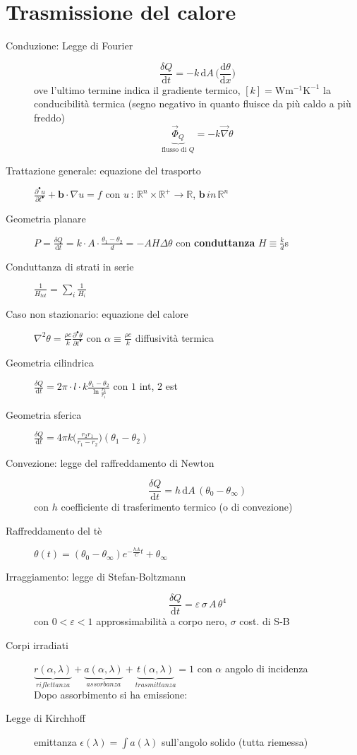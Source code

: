 \documentclass[10pt, oneside]{article}
\begin{document}
\section{Trasmissione del calore}
\begin{description}
\item[\large Conduzione: Legge di Fourier] 
\[\boxed{\frac{\delta Q}{\mathrm{d}t} = - k \, \mathrm{d}A \, \bigg(\frac{\mathrm{d}\theta}{\mathrm{d}x}\bigg)}\] ove l'ultimo termine indica il gradiente termico, $[k] = \mathrm{W m^{-1} K^{-1}}$ la conducibilità termica (segno negativo in quanto fluisce da più caldo a più freddo)
\[\underbrace{\vec{\Phi}_Q}_{\textrm{flusso di } Q} = - k \vec{\nabla} \theta\]
\item[Trattazione generale: equazione del trasporto] $\displaystyle \frac{\partial^{•} u}{\partial t^{•}} + \mathbf{b} \cdot \nabla u = f$ con $u \, : \, \mathbb{R}^n \times \mathbb{R}^+ \rightarrow \mathbb{R}$, $\mathbf{b} \, in \, \mathbb{R}^n$
\item[Geometria planare] $\displaystyle P = \frac{\delta Q}{\mathrm{d} t} = k \cdot A \cdot \frac{\theta_1 - \theta_2}{d} = - A H \Delta \theta$ con \textbf{conduttanza} $\displaystyle H \equiv \frac{k}{d}$s
\item[Conduttanza di strati in serie] $\displaystyle \frac{1}{H_{tot}} = \sum_i \frac{1}{H_i}$
\item[Caso non stazionario: equazione del calore] $\displaystyle \nabla^2 \theta = \frac{\rho c}{k} \frac{\partial^{•} \theta}{\partial t^{•}}$ con $\displaystyle \alpha \equiv \frac{\rho c}{k}$ diffusività termica
\item[Geometria cilindrica] $\displaystyle \frac{\delta Q}{\mathrm{d} t} = 2 \pi \cdot l \cdot k \frac{\theta_1 - \theta_2}{\displaystyle \ln \frac{r_2}{r_1}}$ con $1$ int, $2$ est
\item[Geometria sferica] $\displaystyle \frac{\delta Q}{\mathrm{d} t} = 4 \pi k \bigg(\frac{r_2 r_1}{r_1 - r_2}\bigg)(\theta_1 - \theta_2)$
\item[\large Convezione: legge del raffreddamento di Newton]
\[\boxed{\frac{\delta Q}{\mathrm{d} t} = h \, \mathrm{d}A \,(\theta_0 - \theta_\infty)}\]
con $h$ coefficiente di trasferimento termico (o di convezione)
\item[Raffreddamento del tè] $\displaystyle \theta(t) = (\theta_0 - \theta_\infty) e^{\displaystyle - \frac{hA}{C}t} + \theta_\infty$
\item[\large Irraggiamento: legge di Stefan-Boltzmann]
\[\boxed{\frac{\delta Q}{\mathrm{d}t} = \varepsilon \, \sigma \, A \, \theta^4}\]
con $0<\varepsilon<1$ approssimabilità a corpo nero, $\sigma$ cost. di S-B
\item[Corpi irradiati] $\displaystyle \underbrace{r(\alpha, \lambda)}_{riflettanza} + \underbrace{a(\alpha, \lambda)}_{assorbanza} + \underbrace{t(\alpha, \lambda)}_{trasmittanza} = 1$ con $\alpha$ angolo di incidenza
\\Dopo assorbimento si ha emissione:
\item[Legge di Kirchhoff] emittanza $\displaystyle \epsilon(\lambda) = \int a(\lambda)$ sull'angolo solido (tutta riemessa)
\end{description}
\end{document}
